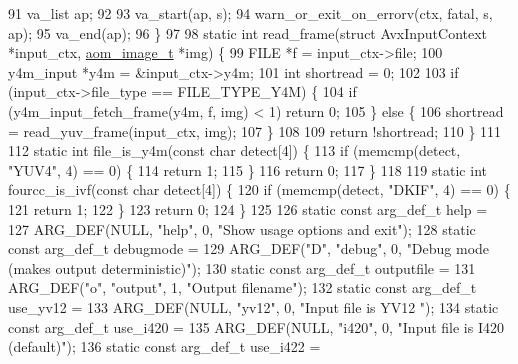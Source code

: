 \begin{DoxyCodeInclude}
{{91   va\_list ap;
92 
93   va\_start(ap, s);
94   warn\_or\_exit\_on\_errorv(ctx, fatal, s, ap);
95   va\_end(ap);
96 \}
97 
98 \textcolor{keyword}{static} \textcolor{keywordtype}{int} read\_frame(\textcolor{keyword}{struct} AvxInputContext *input\_ctx, \hyperlink{structaom__image}{aom\_image\_t} *img) \{
99   FILE *f = input\_ctx->file;
100   y4m\_input *y4m = &input\_ctx->y4m;
101   \textcolor{keywordtype}{int} shortread = 0;
102 
103   \textcolor{keywordflow}{if} (input\_ctx->file\_type == FILE\_TYPE\_Y4M) \{
104     \textcolor{keywordflow}{if} (y4m\_input\_fetch\_frame(y4m, f, img) < 1) \textcolor{keywordflow}{return} 0;
105   \} \textcolor{keywordflow}{else} \{
106     shortread = read\_yuv\_frame(input\_ctx, img);
107   \}
108 
109   \textcolor{keywordflow}{return} !shortread;
110 \}
111 
112 \textcolor{keyword}{static} \textcolor{keywordtype}{int} file\_is\_y4m(\textcolor{keyword}{const} \textcolor{keywordtype}{char} detect[4]) \{
113   \textcolor{keywordflow}{if} (memcmp(detect, \textcolor{stringliteral}{"YUV4"}, 4) == 0) \{
114     \textcolor{keywordflow}{return} 1;
115   \}
116   \textcolor{keywordflow}{return} 0;
117 \}
118 
119 \textcolor{keyword}{static} \textcolor{keywordtype}{int} fourcc\_is\_ivf(\textcolor{keyword}{const} \textcolor{keywordtype}{char} detect[4]) \{
120   \textcolor{keywordflow}{if} (memcmp(detect, \textcolor{stringliteral}{"DKIF"}, 4) == 0) \{
121     \textcolor{keywordflow}{return} 1;
122   \}
123   \textcolor{keywordflow}{return} 0;
124 \}
125 
126 \textcolor{keyword}{static} \textcolor{keyword}{const} arg\_def\_t help =
127     ARG\_DEF(NULL, \textcolor{stringliteral}{"help"}, 0, \textcolor{stringliteral}{"Show usage options and exit"});
128 \textcolor{keyword}{static} \textcolor{keyword}{const} arg\_def\_t debugmode =
129     ARG\_DEF(\textcolor{stringliteral}{"D"}, \textcolor{stringliteral}{"debug"}, 0, \textcolor{stringliteral}{"Debug mode (makes output deterministic)"});
130 \textcolor{keyword}{static} \textcolor{keyword}{const} arg\_def\_t outputfile =
131     ARG\_DEF(\textcolor{stringliteral}{"o"}, \textcolor{stringliteral}{"output"}, 1, \textcolor{stringliteral}{"Output filename"});
132 \textcolor{keyword}{static} \textcolor{keyword}{const} arg\_def\_t use\_yv12 =
133     ARG\_DEF(NULL, \textcolor{stringliteral}{"yv12"}, 0, \textcolor{stringliteral}{"Input file is YV12 "});
134 \textcolor{keyword}{static} \textcolor{keyword}{const} arg\_def\_t use\_i420 =
135     ARG\_DEF(NULL, \textcolor{stringliteral}{"i420"}, 0, \textcolor{stringliteral}{"Input file is I420 (default)"});
136 \textcolor{keyword}{static} \textcolor{keyword}{const} arg\_def\_t use\_i422 =
}}
\end{DoxyCodeInclude}
